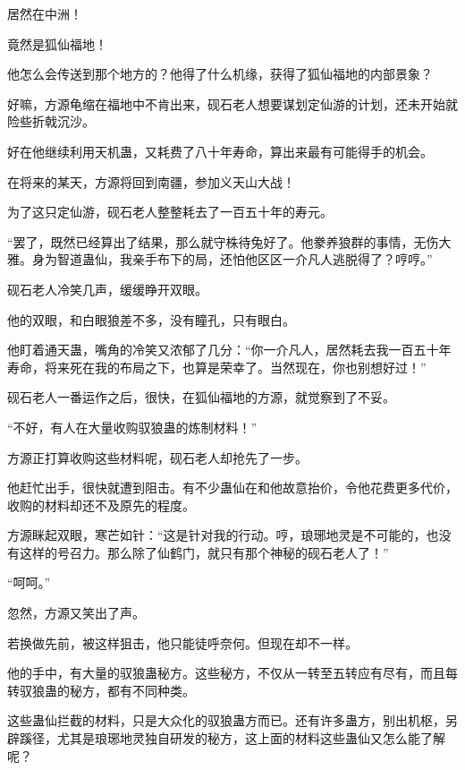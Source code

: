 \begin{this_body}
居然在中洲！

竟然是狐仙福地！

他怎么会传送到那个地方的？他得了什么机缘，获得了狐仙福地的内部景象？

好嘛，方源龟缩在福地中不肯出来，砚石老人想要谋划定仙游的计划，还未开始就险些折戟沉沙。

好在他继续利用天机蛊，又耗费了八十年寿命，算出来最有可能得手的机会。

在将来的某天，方源将回到南疆，参加义天山大战！

为了这只定仙游，砚石老人整整耗去了一百五十年的寿元。

“罢了，既然已经算出了结果，那么就守株待兔好了。他豢养狼群的事情，无伤大雅。身为智道蛊仙，我亲手布下的局，还怕他区区一介凡人逃脱得了？哼哼。”

砚石老人冷笑几声，缓缓睁开双眼。

他的双眼，和白眼狼差不多，没有瞳孔，只有眼白。

他盯着通天蛊，嘴角的冷笑又浓郁了几分：“你一介凡人，居然耗去我一百五十年寿命，将来死在我的布局之下，也算是荣幸了。当然现在，你也别想好过！”

砚石老人一番运作之后，很快，在狐仙福地的方源，就觉察到了不妥。

“不好，有人在大量收购驭狼蛊的炼制材料！”

方源正打算收购这些材料呢，砚石老人却抢先了一步。

他赶忙出手，很快就遭到阻击。有不少蛊仙在和他故意抬价，令他花费更多代价，收购的材料却还不及原先的程度。

方源眯起双眼，寒芒如针：“这是针对我的行动。哼，琅琊地灵是不可能的，也没有这样的号召力。那么除了仙鹤门，就只有那个神秘的砚石老人了！”

“呵呵。”

忽然，方源又笑出了声。

若换做先前，被这样狙击，他只能徒呼奈何。但现在却不一样。

他的手中，有大量的驭狼蛊秘方。这些秘方，不仅从一转至五转应有尽有，而且每转驭狼蛊的秘方，都有不同种类。

这些蛊仙拦截的材料，只是大众化的驭狼蛊方而已。还有许多蛊方，别出机枢，另辟蹊径，尤其是琅琊地灵独自研发的秘方，这上面的材料这些蛊仙又怎么能了解呢？

\end{this_body}

